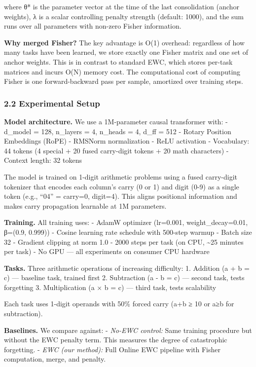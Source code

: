 \documentclass[
]{article}
\begin{document}
where θ* is the parameter vector at the time of the last consolidation
(anchor weights), λ is a scalar controlling penalty strength (default:
1000), and the sum runs over all parameters with non-zero Fisher
information.

\textbf{Why merged Fisher?} The key advantage is O(1) overhead:
regardless of how many tasks have been learned, we store exactly one
Fisher matrix and one set of anchor weights. This is in contrast to
standard EWC, which stores per-task matrices and incurs O(N) memory
cost. The computational cost of computing Fisher is one forward-backward
pass per sample, amortized over training steps.

\subsubsection{2.2 Experimental Setup}\label{experimental-setup}

\textbf{Model architecture.} We use a 1M-parameter causal transformer
with: - d\_model = 128, n\_layers = 4, n\_heads = 4, d\_ff = 512 -
Rotary Position Embeddings (RoPE) - RMSNorm normalization - ReLU
activation - Vocabulary: 44 tokens (4 special + 20 fused carry-digit
tokens + 20 math characters) - Context length: 32 tokens

The model is trained on 1-digit arithmetic problems using a fused
carry-digit tokenizer that encodes each column's carry (0 or 1) and
digit (0-9) as a single token (e.g., ``04'' = carry=0, digit=4). This
aligns positional information and makes carry propagation learnable at
1M parameters.

\textbf{Training.} All training uses: - AdamW optimizer (lr=0.001,
weight\_decay=0.01, β=(0.9, 0.999)) - Cosine learning rate schedule with
500-step warmup - Batch size 32 - Gradient clipping at norm 1.0 - 2000
steps per task (on CPU, \textasciitilde25 minutes per task) - No GPU ---
all experiments on consumer CPU hardware

\textbf{Tasks.} Three arithmetic operations of increasing difficulty: 1.
Addition (a + b = c) --- baseline task, trained first 2. Subtraction (a
- b = c) --- second task, tests forgetting 3. Multiplication (a × b = c)
--- third task, tests scalability

Each task uses 1-digit operands with 50\% forced carry (a+b ≥ 10 or a≥b
for subtraction).

\textbf{Baselines.} We compare against: - \emph{No-EWC control:} Same
training procedure but without the EWC penalty term. This measures the
degree of catastrophic forgetting. - \emph{EWC (our method):} Full
Online EWC pipeline with Fisher computation, merge, and penalty.
\end{document}

